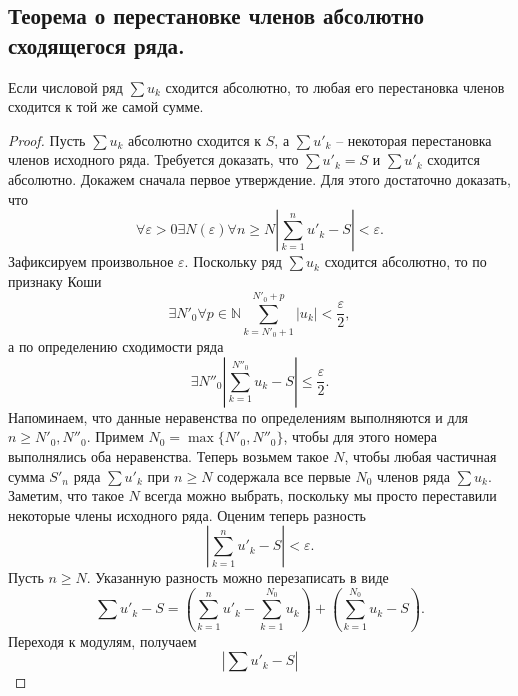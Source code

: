 \subsection{Теорема о перестановке членов абсолютно сходящегося ряда.} \label{transp_theorem}
\begin{theorem}
    Если числовой ряд $\sum u_k$ сходится абсолютно, то любая его перестановка членов сходится к той же самой сумме.
    \begin{proof}
        Пусть $\sum u_k$ абсолютно сходится к $S$, а $\sum u'_k$ -- некоторая перестановка членов исходного ряда. Требуется доказать, что $\sum u'_k = S$ и $\sum u'_k$ сходится абсолютно. Докажем сначала первое утверждение. Для этого достаточно доказать, что
        \[
            \forall \varepsilon > 0
            \exists N(\varepsilon)
            \forall n \geqslant N
            \left| 
                \sum_{k=1}^n u'_k - S 
            \right| < \varepsilon.
        \]
        Зафиксируем произвольное $\varepsilon$. Поскольку ряд $\sum u_k$ сходится абсолютно, то по признаку Коши
        \[
            \exists N'_0
            \forall p \in \mathbb{N}
            \sum_{k=N'_0 + 1}^{N'_0 + p}
            |u_k| < \frac{\varepsilon}{2},
        \]
        а по определению сходимости ряда
        \[
            \exists N''_0
            \left|
                \sum_{k=1}^{N''_0} u_k - S
            \right| \leqslant \frac{\varepsilon}{2}.
        \]
        Напоминаем, что данные неравенства по определениям выполняются и для $n \geqslant N'_0, N''_0$. Примем $N_0 = \max \{ N'_0, N''_0 \}$, чтобы для этого номера выполнялись оба неравенства. Теперь возьмем такое $N$, чтобы любая частичная сумма $S'_n$ ряда $\sum u'_k$ при $n \geqslant N$ содержала все первые $N_0$ членов ряда $\sum u_k$. Заметим, что такое $N$ всегда можно выбрать, поскольку мы просто переставили некоторые члены исходного ряда.
        \newline
        Оценим теперь разность
        \[
            \left| 
                \sum_{k=1}^n u'_k - S 
            \right| < \varepsilon.
        \]
        Пусть $n \geqslant N$. Указанную разность можно перезаписать в виде
        \[
            \sum u'_k - S
            =
            \left(
                \sum_{k=1}^n u'_k
                -
                \sum_{k=1}^{N_0} u_k
            \right)
            +
            \left(
                \sum_{k=1}^{N_0} u_k
                -
                S
            \right).
        \]
        Переходя к модулям, получаем
        \[
            \left|
                \sum u'_k - S
            \right|
\]
\end{proof}
\end{theorem}
